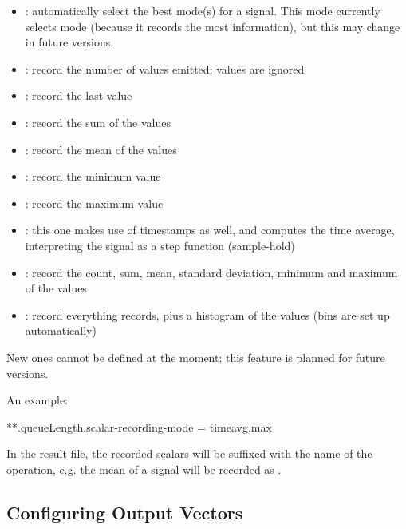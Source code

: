 \begin{itemize}
  \item{}: automatically select the best mode(s) for a signal. This mode
      currently selects  mode (because it records the most
      information), but this may change in future versions.
  \item{}: record the number of values emitted; values are ignored
  \item{}: record the last value
  \item{}: record the sum of the values
  \item{}: record the mean of the values
  \item{}: record the minimum value
  \item{}: record the maximum value
  \item{}: this one makes use of timestamps as well, and computes the
      time average, interpreting the signal as a step function (sample-hold)
  \item{}: record the count, sum, mean, standard deviation, minimum
      and maximum of the values
  \item{}: record everything  records, plus a histogram
      of the values (bins are set up automatically)
\end{itemize}

New ones cannot be defined at the moment; this feature is planned for future versions.

An example:

\begin{inifile}
**.queueLength.scalar-recording-mode = timeavg,max
\end{inifile}

In the result file, the recorded scalars will be suffixed with the name
of the operation, e.g. the mean of a  signal will
be recorded as .



\subsection{Configuring Output Vectors}
\label{sec:ana-sim:vector-config}

